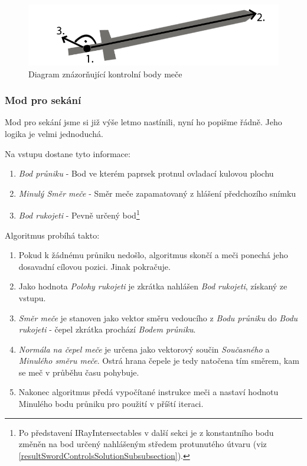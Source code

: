 \begin{figure}[ht]\centering
    \center
    \includegraphics[width=140mm]{../img/diagram-swordPositioning.png}
    \caption{Diagram znázorňující kontrolní body meče}
    \label{obr04:swordPositioningDiagram}
\end{figure} 


\subsubsection*{Mod pro sekání}

Mod pro sekání jsme si již výše letmo nastínili, nyní ho popišme řádně. Jeho logika je velmi jednoduchá.

Na vstupu dostane tyto informace:
\begin{enumerate}
    \item \textit{Bod průniku} - Bod ve kterém paprsek protnul ovladací kulovou plochu
    \item \textit{Minulý Směr meče} - Směr meče zapamatovaný z hlášení předchozího snímku
    \item \textit{Bod rukojeti} - Pevně určený bod\footnote{Po představení IRayIntersectables v další sekci je z konstantního bodu změněn na bod určený nahlášeným středem protunutého útvaru (viz \ref{resultSwordControlsSolutionSubsubsection}).}
\end{enumerate}

Algoritmus probíhá takto:
\begin{enumerate}
    \addtocounter{enumi}{-1}
    \item Pokud k žádnému průniku nedošlo, algoritmus skončí a meči ponechá jeho dosavadní cílovou pozici. Jinak pokračuje.
    \item Jako hodnota \textit{Polohy rukojeti} je zkrátka nahlášen \textit{Bod rukojeti}, získaný ze vstupu.
    \item \textit{Směr meče} je stanoven jako vektor směru vedoucího z \textit{Bodu průniku} do \textit{Bodu rukojeti} - čepel zkrátka prochází \textit{Bodem průniku}.
    \item \textit{Normála na čepel meče} je určena jako vektorový součin \textit{Současného} a \textit{Minulého směru meče}. Ostrá hrana čepele je tedy natočena tím směrem, kam se meč v průběhu času pohybuje. 
    \item Nakonec algoritmus předá vypočítané instrukce meči a nastaví hodnotu Minulého bodu průniku pro použití v příští iteraci.
\end{enumerate}

